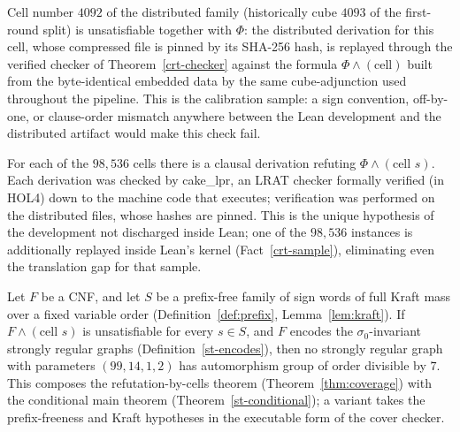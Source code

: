 \begin{fact}\label{crt-sample}
Cell number $4092$ of the distributed family (historically cube $4093$ of
the first-round split) is unsatisfiable together with $\Phi$: the
distributed derivation for this cell, whose compressed file is pinned by
its SHA-256 hash, is replayed through the verified checker of
Theorem~\ref{crt-checker} against the formula
$\Phi \wedge (\text{cell})$ built from the byte-identical embedded data by
the same cube-adjunction used throughout the pipeline.  This is the
calibration sample: a sign convention, off-by-one, or clause-order mismatch
anywhere between the Lean development and the distributed artifact would
make this check fail.
\leanok
{}
\end{fact}

\begin{fact}\label{fact:certificates}
For each of the $98{,}536$ cells there is a clausal derivation refuting
$\Phi \wedge (\text{cell } s)$.  Each derivation was checked by
\textsf{cake\_lpr}, an LRAT checker formally verified (in HOL4) down to the
machine code that executes; verification was performed on the distributed
files, whose hashes are pinned.  This is the unique hypothesis of the
development not discharged inside Lean; one of the $98{,}536$ instances is
additionally replayed inside Lean's kernel (Fact~\ref{crt-sample}),
eliminating even the translation gap for that sample.
\end{fact}

\begin{theorem}\label{crt-schema}
Let $F$ be a CNF, and let $S$ be a prefix-free family of sign words of full
Kraft mass over a fixed variable order (Definition~\ref{def:prefix},
Lemma~\ref{lem:kraft}).  If $F \wedge (\text{cell } s)$ is unsatisfiable
for every $s \in S$, and $F$ encodes the $\sigma_0$-invariant strongly
regular graphs (Definition~\ref{st-encodes}), then no strongly regular
graph with parameters $(99,14,1,2)$ has automorphism group of order
divisible by $7$.  This composes the refutation-by-cells theorem
(Theorem~\ref{thm:coverage}) with the conditional main theorem
(Theorem~\ref{st-conditional}); a variant takes the prefix-freeness and
Kraft hypotheses in the executable form of the cover checker.
\leanok
{}
\end{theorem}

